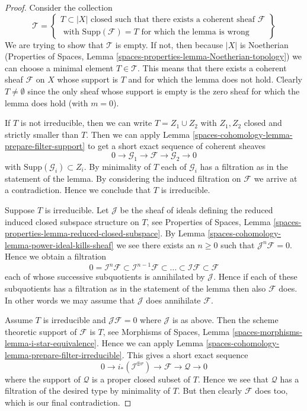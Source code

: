 \begin{proof}
Consider the collection
$$
\mathcal{T} =
\left\{
\begin{matrix}
T \subset |X|
\text{ closed such that there exists a coherent sheaf }
\mathcal{F} \\
\text{ with }
\text{Supp}(\mathcal{F}) = T
\text{ for which the lemma is wrong}
\end{matrix}
\right\}
$$
We are trying to show that $\mathcal{T}$ is empty. If not, then
because $|X|$ is Noetherian (Properties of Spaces, Lemma
\ref{spaces-properties-lemma-Noetherian-topology})
we can choose a minimal element $T \in \mathcal{T}$. This means that
there exists a coherent sheaf $\mathcal{F}$ on $X$ whose support is $T$
and for which the lemma does not hold. Clearly $T \not = \emptyset$ since
the only sheaf whose support is empty is the zero sheaf for which the
lemma does hold (with $m = 0$).

\medskip\noindent
If $T$ is not irreducible, then we can write $T = Z_1 \cup Z_2$
with $Z_1, Z_2$ closed and strictly smaller than $T$.
Then we can apply Lemma \ref{spaces-cohomology-lemma-prepare-filter-support}
to get a short exact sequence of coherent sheaves
$$
0 \to
\mathcal{G}_1 \to
\mathcal{F} \to
\mathcal{G}_2 \to 0
$$
with $\text{Supp}(\mathcal{G}_i) \subset Z_i$. By minimality of
$T$ each of $\mathcal{G}_i$ has a filtration as in the statement
of the lemma. By considering the induced filtration on $\mathcal{F}$
we arrive at a contradiction. Hence we conclude
that $T$ is irreducible.

\medskip\noindent
Suppose $T$ is irreducible. Let $\mathcal{J}$ be the sheaf of ideals
defining the reduced induced closed subspace structure on $T$,
see Properties of Spaces, Lemma
\ref{spaces-properties-lemma-reduced-closed-subspace}.
By Lemma \ref{spaces-cohomology-lemma-power-ideal-kills-sheaf} we see there exists
an $n \geq 0$ such that $\mathcal{J}^n\mathcal{F} = 0$. Hence we obtain
a filtration
$$
0 = \mathcal{I}^n\mathcal{F} \subset \mathcal{I}^{n - 1}\mathcal{F}
\subset \ldots \subset \mathcal{I}\mathcal{F} \subset \mathcal{F}
$$
each of whose successive subquotients is annihilated by $\mathcal{J}$.
Hence if each of these subquotients has a filtration as in the statement
of the lemma then also $\mathcal{F}$ does. In other words we may
assume that $\mathcal{J}$ does annihilate $\mathcal{F}$.

\medskip\noindent
Assume $T$ is irreducible and $\mathcal{J}\mathcal{F} = 0$ where
$\mathcal{J}$ is as above. Then the scheme theoretic support of
$\mathcal{F}$ is $T$, see
Morphisms of Spaces, Lemma \ref{spaces-morphisms-lemma-i-star-equivalence}.
Hence we can apply Lemma \ref{spaces-cohomology-lemma-prepare-filter-irreducible}.
This gives a short exact sequence
$$
0 \to
i_*(\mathcal{I}^{\oplus r}) \to
\mathcal{F} \to
\mathcal{Q} \to 0
$$
where the support of $\mathcal{Q}$ is a proper closed subset of $T$.
Hence we see that $\mathcal{Q}$ has a filtration of the desired type
by minimality of $T$. But then clearly $\mathcal{F}$ does too, which is
our final contradiction.
\end{proof}


